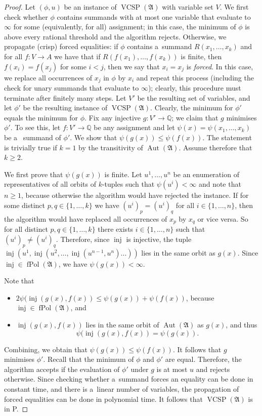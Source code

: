 \documentclass[10pt,a4paper]{amsart}
\DeclareMathOperator{\Aut}{Aut}
\newcommand{\Q}{\mathbb Q}
\newcommand{\bA}{{\mathfrak A}}
\DeclareMathOperator{\fPol}{fPol}
\DeclareMathOperator{\inj}{inj}
\DeclareMathOperator{\vcsp}{VCSP}
\begin{document}
\begin{proof}
Let $(\phi,u)$ be an instance of $\vcsp(\bA)$ with variable set $V$.
We first check whether $\phi$ contains summands with at most one variable that evaluate to $\infty$ for some (equivalently, for all) assignment; in this case, the minimum of $\phi$ is above every rational threshold and the algorithm rejects. 
Otherwise, we propagate (crisp) forced equalities:
if $\phi$ contains a~summand $R(x_1,\dots,x_k)$ 
and for all $f \colon V \to A$ we have that 
if $R(f(x_1),\dots,f(x_k))$ is finite, then $f(x_i) = f(x_j)$ for some $i<j$, then we say that $x_i = x_j$ is \emph{forced}.
In this case, we replace all occurrences of $x_j$ in $\phi$ by $x_i$ and repeat this process (including the check for unary summands that evaluate to $\infty$); clearly, this procedure must terminate after finitely many steps. 
Let $V'$ be the resulting set of variables, and let $\phi'$ be the resulting instance of $\vcsp(\bA)$. 
Clearly, the minimum for $\phi'$ equals the minimum for $\phi$.
Fix any injective $g \colon V' \to \Q$; we claim that $g$ minimises $\phi'$.
To see this, let 
$f \colon V' \to \Q$ be any assignment and let 
$\psi(x) = \psi(x_1,\dots,x_k)$ be a~ summand 
of $\phi'$. 
We show that $\psi(g(x)) \leq \psi(f(x))$. The statement is trivially true if $k=1$ by the transitivity of $\Aut(\bA)$.
Assume therefore that $k \geq 2$.

We first prove that $\psi(g(x))$ is finite.
Let $u^1,\dots,u^n$ be an enumeration of representatives of all orbits of $k$-tuples 
such that $\psi(u^i) < \infty$ and note that $n\geq 1$, because otherwise the algorithm would have rejected the instance. If for some distinct $p,q \in \{1,\dots,k\}$ 
we have  $(u^i)_p = (u^i)_q$ for all $i \in \{1,\dots,n\}$, then 
the algorithm would have replaced all occurrences of $x_p$ by $x_q$ or vice versa.
So
for all distinct $p,q \in \{1,\dots,k\}$ 
there exists $i \in \{1,\dots,n\}$ such that 
$(u^i)_p \neq (u^i)_q$.
Therefore, 
since $\inj$ is injective, the tuple $\inj(u^1,\inj(u^2,\dots,\inj(u^{n-1},u^n)\dots))$ lies in the same orbit as $g(x)$. Since $\inj \in \fPol(\bA)$, we have
$\psi(g(x)) < \infty$.

Note that
\begin{itemize}
\item 
$2 \psi(\inj(g(x),f(x)) \leq \psi(g(x)) + \psi(f(x))$, because $\inj \in \fPol(\bA)$, and 
\item $\inj(g(x),f(x))$ lies in the same orbit of $\Aut(\bA)$ as $g(x)$, and thus
$$\psi(\inj(g(x),f(x)) = \psi(g(x)).$$
\end{itemize}
Combining, we obtain 
that 
$\psi(g(x)) \leq \psi(f(x))$. 
It follows that $g$ minimises $\phi'$.
Recall that the minimum of $\phi$ and $\phi'$ are equal. Therefore, the algorithm accepts if the evaluation of $\phi'$ under $g$ is at most $u$ and rejects otherwise.
Since checking whether a~summand forces an equality can be done in constant time, and there is a~linear number of variables, the propagation of forced equalities can be done in polynomial time.
It follows that $\vcsp(\bA)$ is in P. 
\end{proof} 
\end{document}
